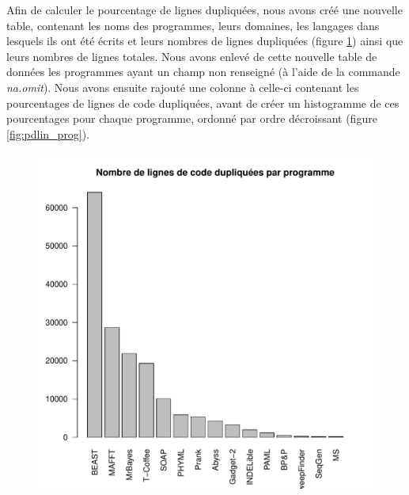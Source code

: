 Afin de calculer le pourcentage de lignes dupliquées, nous avons créé
une nouvelle table, contenant les noms des programmes, leurs
domaines, les langages dans lesquels ils ont été écrits et leurs
nombres de lignes dupliquées (figure \ref{fig:dlin_prog}) ainsi que
leurs nombres de lignes totales. Nous avons enlevé de cette nouvelle
table de données les programmes ayant un champ non renseigné (à
l'aide de la commande \emph{na.omit}). Nous avons ensuite rajouté une
colonne à celle-ci contenant les pourcentages de lignes de code
dupliquées, avant de créer un histogramme de ces pourcentages pour
chaque programme, ordonné par ordre décroissant (figure
\ref{fig:pdlin_prog}).

\begin{figure}[!h]
  \includegraphics[width=\linewidth]{figures/dlin_prog.pdf}
  \caption{}\label{fig:dlin_prog}
  \endminipage\hfill

\end{figure}
